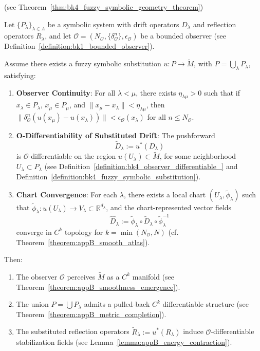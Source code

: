 \begin{theorem} 
\label{thm:bk4_restated_fuzzy_symbolic_geometry_theorem} 
(see Theorem~\ref{thm:bk4_fuzzy_symbolic_geometry_theorem})

Let \( \{P_\lambda\}_{\lambda \in \Lambda} \) be a symbolic system with drift operators \( D_\lambda \) and reflection operators \( R_\lambda \), and let \( \mathcal{O} = (N_\mathcal{O}, \{\delta^n_\mathcal{O}\}, \epsilon_\mathcal{O}) \) be a bounded observer (see Definition~\ref{definition:bk1_bounded_observer}). 

Assume there exists a fuzzy symbolic substitution \( u : P \to \tilde{M} \), with \( P = \bigcup_\lambda P_\lambda \), satisfying:

\begin{enumerate}
  \item \textbf{Observer Continuity}: For all \( \lambda < \mu \), there exists \( \eta_{\lambda\mu} > 0 \) such that if \( x_\lambda \in P_\lambda \), \( x_\mu \in P_\mu \), and \( \|x_\mu - x_\lambda\| < \eta_{\lambda\mu} \), then \( \|\delta^n_\mathcal{O}(u(x_\mu) - u(x_\lambda))\| < \epsilon_\mathcal{O}(x_\lambda) \) for all \( n \leq N_\mathcal{O} \).

  \item \textbf{O-Differentiability of Substituted Drift}: 
  The pushforward 
  \[
  \tilde{D}_\lambda := u^*(D_\lambda)
  \]
  is \( \mathcal{O} \)-differentiable on the region \( u(U_\lambda) \subset \tilde{M} \), 
  for some neighborhood \( U_\lambda \subset P_\lambda \) (see Definition~\ref{definition:bk4_observer_differentiable_} and Definition~\ref{definition:bk4_fuzzy_symbolic_substitution}).

  \item \textbf{Chart Convergence}: For each \( \lambda \), there exists a local chart \( (U_\lambda, \tilde{\phi}_\lambda) \) such that \( \tilde{\phi}_\lambda : u(U_\lambda) \to V_\lambda \subset \mathbb{R}^{d_\lambda} \), and the chart-represented vector fields 
  \[
  \hat{D}_\lambda := \tilde{\phi}_\lambda \circ \tilde{D}_\lambda \circ \tilde{\phi}_\lambda^{-1}
  \]
  converge in \( C^k \) topology for \( k = \min(N_\mathcal{O}, N) \) (cf. Theorem~\ref{theorem:appB_smooth_atlas}).
\end{enumerate}

Then:
\begin{enumerate}
  \item The observer \( \mathcal{O} \) perceives \( \tilde{M} \) as a \( C^k \) manifold (see Theorem~\ref{theorem:appB_smoothness_emergence}).

  \item The union \( P = \bigcup P_\lambda \) admits a pulled-back \( C^k \) differentiable structure (see Theorem~\ref{theorem:appB_metric_completion}).

  \item The substituted reflection operators \( \tilde{R}_\lambda := u^*(R_\lambda) \) induce \( \mathcal{O} \)-differentiable stabilization fields (see Lemma~\ref{lemma:appB_energy_contraction}).
\end{enumerate}
\end{theorem}

